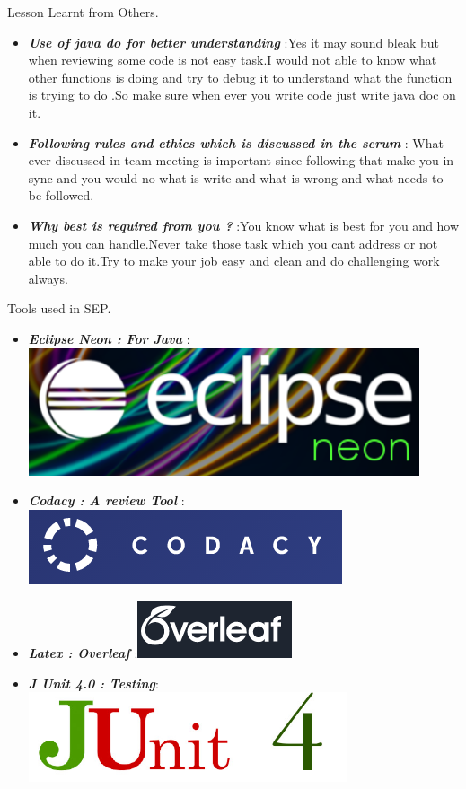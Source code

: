 \documentclass[final]{beamer}
\newlength{\onecolwid}
\begin{document}
\begin{frame}[t]
\begin{columns}[t]
\begin{column}{\onecolwid}
\begin{block}{Lesson Learnt from Others.}
\begin{itemize}
\item  \textit{\textbf{Use of java do for better understanding}} :Yes it may sound bleak but when reviewing some code is not easy task.I would not able to know what other functions is doing and try to debug it to understand what the function is trying to do .So make sure when ever you write code just write java doc on it.
\item  \textit{\textbf{Following rules and ethics which is discussed in the scrum }} : What ever discussed in team meeting is important since following that make you in sync and you would no what is write and what is wrong and what needs to be followed.
\item \textit{\textbf{Why best is required from you ?}} :You know what is best for you and how much you can handle.Never take those task which you cant address or not able to do it.Try to make your job easy and clean and do challenging work always.  
\end{itemize}
\end{block}

\begin{block}{Tools used in SEP.}
\begin{itemize}
\item  \textit{\textbf{Eclipse Neon : For Java}}  :\includegraphics[scale=1.5]{EclipseNeon.PNG}\ 
\item  \textit{\textbf{Codacy : A review Tool}} :\includegraphics[scale=1.5]{Codacy.PNG}\
\item  \textit{\textbf{Latex : Overleaf}} :\includegraphics[scale=1.5]{overleaf.PNG}\ 
\item  \textit{\textbf{J Unit 4.0 : Testing}}: \includegraphics[scale=1.5]{Junit4.PNG}\
\end{itemize}
\end{block}



\end{column}
\end{columns}
\end{frame}
\end{document}
